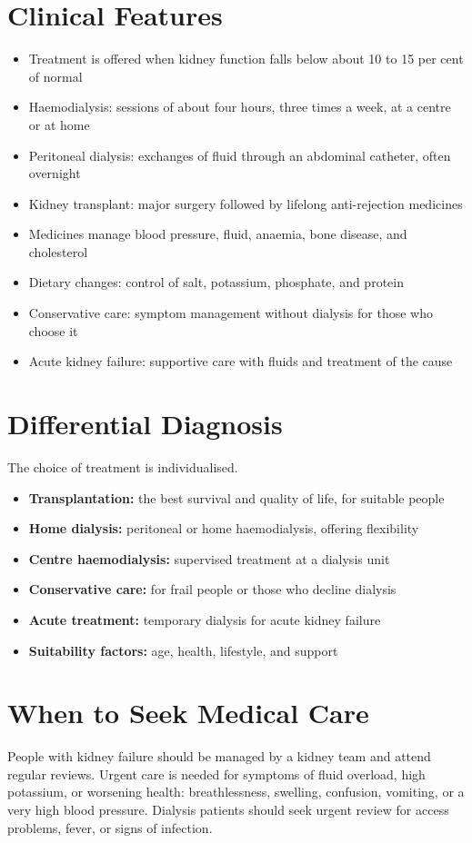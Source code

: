 \section*{Clinical Features}
\begin{itemize}
    \item Treatment is offered when kidney function falls below about 10 to 15 per cent of normal
    \item Haemodialysis: sessions of about four hours, three times a week, at a centre or at home
    \item Peritoneal dialysis: exchanges of fluid through an abdominal catheter, often overnight
    \item Kidney transplant: major surgery followed by lifelong anti-rejection medicines
    \item Medicines manage blood pressure, fluid, anaemia, bone disease, and cholesterol
    \item Dietary changes: control of salt, potassium, phosphate, and protein
    \item Conservative care: symptom management without dialysis for those who choose it
    \item Acute kidney failure: supportive care with fluids and treatment of the cause
\end{itemize}

\section*{Differential Diagnosis}
The choice of treatment is individualised.
\begin{itemize}
    \item \textbf{Transplantation:} the best survival and quality of life, for suitable people
    \item \textbf{Home dialysis:} peritoneal or home haemodialysis, offering flexibility
    \item \textbf{Centre haemodialysis:} supervised treatment at a dialysis unit
    \item \textbf{Conservative care:} for frail people or those who decline dialysis
    \item \textbf{Acute treatment:} temporary dialysis for acute kidney failure
    \item \textbf{Suitability factors:} age, health, lifestyle, and support
\end{itemize}

\section*{When to Seek Medical Care}
People with kidney failure should be managed by a kidney team and attend regular reviews. Urgent care is needed for symptoms of fluid overload, high potassium, or worsening health: breathlessness, swelling, confusion, vomiting, or a very high blood pressure. Dialysis patients should seek urgent review for access problems, fever, or signs of infection.

